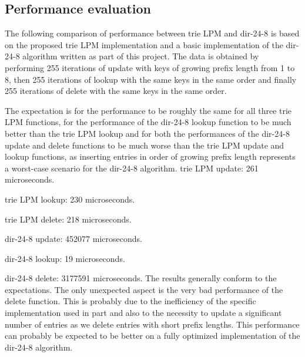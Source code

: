 \documentclass{article}
\begin{document}
\subsection{Performance evaluation}
The following comparison of performance between trie LPM and dir-24-8 is based on
the proposed trie LPM implementation and a basic implementation of the dir-24-8
algorithm written as part of this project. The data is obtained by performing 255
iterations of update with keys of growing prefix length from 1 to 8, then 255
iterations of lookup with the same keys in the same order and finally 255 iterations
of delete with the same keys in the same order. \par
The expectation is for the performance to be roughly the same for all three trie
LPM functions, for the performance of the dir-24-8 lookup function to be much better
than the trie LPM lookup and for both the performances of the dir-24-8 update
and delete functions to be much worse than the trie LPM update and lookup functions,
as inserting entries in order of growing prefix length represents a worst-case
scenario for the dir-24-8 algorithm.
\bigbreak
trie LPM update: 261 microseconds.\par
trie LPM lookup: 230 microseconds.\par
trie LPM delete: 218 microseconds.\par
dir-24-8 update: 452077 microseconds.\par
dir-24-8 lookup: 19 microseconds.\par
dir-24-8 delete: 3177591 microseconds.
\bigbreak
The results generally conform to the expectations. The only unexpected aspect is
the very bad performance of the delete function. This is probably due to the
inefficiency of the specific implementation used in part and also to the necessity
to update a significant number of entries as we delete entries with short prefix
lengths. This performance can probably be expected to be better on a fully optimized
implementation of the dir-24-8 algorithm.
\end{document}
